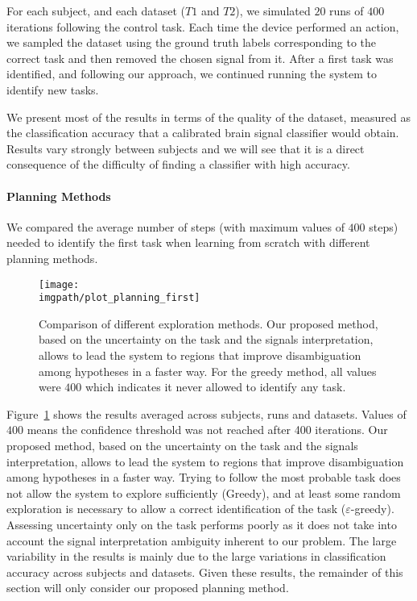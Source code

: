 For each subject, and each dataset ($T1$ and $T2$), we simulated $20$ runs of $400$ iterations following the control task. Each time the device performed an action, we sampled the dataset using the ground truth labels corresponding to the correct task and then removed the chosen signal from it. After a first task was identified, and following our approach, we continued running the system to identify new tasks. 

We present most of the results in terms of the quality of the dataset, measured as the classification accuracy that a calibrated brain signal classifier would obtain. Results vary strongly between subjects and we will see that it is a direct consequence of the difficulty of finding a classifier with high accuracy. 

\paragraph{Planning Methods}
We compared the average number of steps (with maximum values of $400$ steps) needed to identify the first task when learning from scratch with different planning methods.

\begin{figure}[!ht]
    \centering
    \texttt{[image: \\imgpath/plot\_planning\_first]}
    \caption{Comparison of different exploration methods. Our proposed method, based on the uncertainty on the task and the signals interpretation, allows to lead the system to regions that improve disambiguation among hypotheses in a faster way. For the greedy method, all values were $400$ which indicates it never allowed to identify any task.}
    \label{fig:compplan}
\end{figure}

Figure~\ref{fig:compplan} shows the results averaged across subjects, runs and datasets. Values of $400$ means the confidence threshold was not reached after 400 iterations. Our proposed method, based on the uncertainty on the task and the signals interpretation, allows to lead the system to regions that improve disambiguation among hypotheses in a faster way. Trying to follow the most probable task does not allow the system to explore sufficiently (Greedy), and at least some random exploration is necessary to allow a correct identification of the task ($\varepsilon$-greedy). Assessing uncertainty only on the task performs poorly as it does not take into account the signal interpretation ambiguity inherent to our problem. The large variability in the results is mainly due to the large variations in classification accuracy across subjects and datasets. Given these results, the remainder of this section will only consider our proposed planning method.

